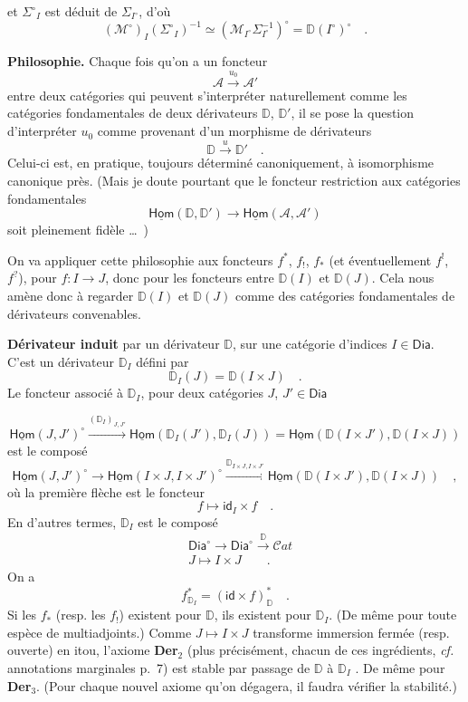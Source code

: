 \documentclass[11pt]{article}
\newcommand{\printedpage}[1]{\marginpar{\footnotesize p.~#1}}
\newcommand{\msp}[1]{\marginpar{\footnotesize [#1]}}
\newcommand{\D}{\mathbb{D}}
\newcommand{\uHom}{\underline{\mathsf{Hom}}}
\newcommand{\Dia}{\mathsf{Dia}}
\newcommand{\id}{\mathsf{id}}
\newcommand{\Cat}{\mathcal{C}at}
\begin{document}
\printedpage{14}

et $\Sigma^\circ{}_I$ est déduit de $\Sigma_{I^\circ}$, d'où
\[
(\mathcal{M}^\circ)_I(\Sigma^\circ{}_I)^{-1} \simeq (\mathcal{M}_{I^\circ}\Sigma_{I^\circ}^{-1})^\circ = \D(I^\circ)^\circ \quad .
\]

\msp{page 18}

\textbf{Philosophie.} Chaque fois qu'on a un foncteur
\[
\mathcal{A} \xrightarrow{u_0} \mathcal{A}'
\]
entre deux catégories qui peuvent s'interpréter naturellement comme les catégories fondamentales de deux dérivateurs $\D$, $\D'$, il se pose la question d'interpréter $u_0$ comme provenant d'un morphisme de dérivateurs
\[
\D \xrightarrow{u} \D' \quad .
\]
Celui-ci est, en pratique, toujours déterminé canoniquement, à isomorphisme canonique près. (Mais je doute pourtant que le foncteur restriction aux catégories fondamentales
\[
\uHom(\D,\D') \longrightarrow \uHom(\mathcal{A},\mathcal{A}')
\]
soit pleinement fidèle \dots\ )

On va appliquer cette philosophie aux foncteurs $f^*$, $f_!$, $f_*$ (et éventuellement $f^!$, $f^?$), pour $f : I \to J$, donc pour les foncteurs entre $\D(I)$ et $\D(J)$. Cela nous amène donc à regarder $\D(I)$ et $\D(J)$ comme des catégories fondamentales de dérivateurs convenables.

\textbf{Dérivateur induit} par un dérivateur $\D$, sur une catégorie d'indices $I \in \Dia$. C'est un dérivateur $\D_I$ défini par
\[
\D_I(J) = \D(I \times J) \quad .
\]
Le foncteur associé à $\D_I$, pour deux catégories $J$, $J' \in \Dia$

\msp{page 19}
\[
\uHom(J,J')^\circ \xrightarrow{(\D_I)_{J,J'}} \uHom(\D_I(J'),\D_I(J)) = \uHom(\D(I\times J'),\D(I\times J))
\]
est le composé
\[
\uHom(J,J')^\circ \longrightarrow \uHom(I\times J, I\times J')^\circ \xrightarrow{\D_{I\times J,I\times J'}} \uHom(\D(I\times J'),\D(I\times J)) \quad ,
\]
où la première flèche est le foncteur
\[
f \longmapsto \id_I \times f \quad .
\]
En d'autres termes, $\D_I$ est le composé
\[
\begin{aligned}
&\Dia^\circ \longrightarrow \Dia^\circ \xrightarrow{\D} \Cat \\
&J \longmapsto I \times J \qquad .
\end{aligned}
\]
On a
\[
f^*_{\D_I} = (\id \times f)^*_{\D} \quad .
\]
Si les $f_*$ (resp. les $f_!$) existent pour $\D$, ils existent pour $\D_I$. (De même pour toute espèce de multiadjoints.) Comme $J \mapsto I \times J$ transforme immersion fermée (resp. ouverte) en itou, l'axiome \textbf{Der}$_2$ (plus précisément, chacun de ces ingrédients, \textit{cf.} annotations marginales p.~7) est stable par passage de $\D$ à $\D_I$ . De même pour \textbf{Der}$_3$. (Pour chaque nouvel axiome qu'on dégagera, il faudra vérifier la stabilité.)
\end{document}
